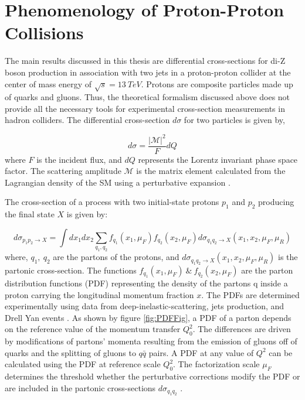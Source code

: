 \section{Phenomenology of Proton-Proton Collisions }    
\label{sec:Pheno}

The main results discussed in this thesis are differential cross-sections for di-Z boson production in association with two jets in a proton-proton collider at the center of mass energy of $\sqrt{s}=13~TeV$. Protons are composite particles made up of quarks and gluons. Thus, the theoretical formalism discussed above does not provide all the necessary tools for experimental cross-section measurements in hadron colliders. The differential cross-section $d\sigma$ for two particles is given by, 

\begin{equation}
d\sigma  = \frac{{|\mathcal{M}|}^2}{F} dQ
\label{eqn:DiffxS}
\end{equation}
where $F$ is the incident flux, and $dQ$ represents the Lorentz invariant phase space factor. The scattering amplitude $\mathcal{M}$ is the matrix element calculated from the Lagrangian density of the SM using a perturbative expansion \cite{QCDForCollider}.

The cross-section of a process with two initial-state protons $p_{1}$ and $p_{2}$ producing the final state $X$ is given by:

\begin{equation}
d\sigma_{p_{1}p_{2} \rightarrow X } = \int dx_{1} dx_{2} \sum_{q_{1},q_{2}} f_{q_{1}}(x_{1},\mu_{F})f_{q_{2}}(x_{2},\mu_{F}) d\sigma_{q_{1}q_{2}\rightarrow X } (x_{1},x_{2},\mu_{F},\mu_{R})
\label{eqn:DifferentialPartonicXS}
\end{equation}
where, $q_{1},~ q_{2}$ are the partons of the protons, and $d\sigma_{q_{1}q_{2}\rightarrow X } (x_{1},x_{2},\mu_{F},\mu_{R})$ is the partonic cross-section. The functions $f_{q_{1}}(x_{1},\mu_{F}) ~\&~ f_{q_{2}}(x_{2},\mu_{F})$ are the parton distribution functions (PDF) representing the density of the partons q inside a proton carrying the longitudinal momentum fraction $x$. The PDFs are determined experimentally using data from deep-inelastic-scattering, jets production, and Drell Yan events \cite{FixedTargetDrellYan} \cite{PDF4LHC}. As shown by figure \ref{fig:PDFFig}, a PDF of a parton depends on the reference value of the momentum transfer $Q_{0}^2$. The differences are driven by modifications of partons' momenta resulting from the emission of gluons off of quarks and the splitting of gluons to $q\bar{q}$ pairs. A PDF at any value of $Q^2$ can be calculated using the PDF at reference scale $Q_{0}^2$. The factorization scale $\mu_{F}$ determines the threshold whether the perturbative corrections modify the PDF or are included in the partonic cross-sections $d\sigma_{q_{1}q_{2}}$ \cite{QCDForCollider}.

